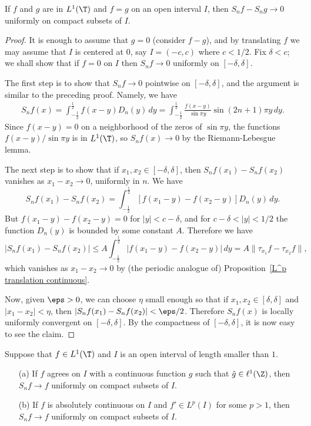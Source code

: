 \begin{theorem}
If $f$ and $g$ are in $L^1(\T)$ and $f=g$ on an open interval $I$, then $S_nf-S_ng\to 0$ uniformly on compact subsets of $I$.
\end{theorem}
\begin{proof}
It is enough to assume that $g=0$ (consider $f-g$), and by translating $f$ we may assume that $I$ is centered at $0$, say $I=(-c,c)$ where $c<1/2$. Fix $\delta<c$; we shall show that if $f=0$ on $I$ then $S_nf\to 0$ uniformly on $[-\delta,\delta]$.\par
The first step is to show that $S_nf\to 0$ pointwise on $[-\delta,\delta]$, and the argument is similar to the preceding proof. Namely, we have
\begin{align*}
S_nf(x)=\int_{-\frac{1}{2}}^{\frac{1}{2}}f(x-y)D_n(y)\,dy=\int_{-\frac{1}{2}}^{\frac{1}{2}}\frac{f(x-y)}{\sin\pi y}\sin(2n+1)\pi y\,dy.
\end{align*}
Since $f(x-y)=0$ on a neighborhood of the zeros of $\sin\pi y$, the functions $f(x-y)/\sin\pi y$ is in $L^1(\T)$, so $S_nf(x)\to 0$ by the Riemann-Lebesgue lemma.\par
The next step is to show that if $x_1,x_2\in [-\delta,\delta]$, then $S_nf(x_1)-S_nf(x_2)$ vanishes as $x_1-x_2\to 0$, uniformly in $n$. We have
\[S_nf(x_1)-S_nf(x_2)=\int_{-\frac{1}{2}}^{\frac{1}{2}}[f(x_1-y)-f(x_2-y)]D_n(y)\,dy.\]
But $f(x_1-y)-f(x_2-y)=0$ for $|y|<c-\delta$, and for $c-\delta<|y|<1/2$ the function $D_n(y)$ is bounded by some constant $A$. Therefore we have
\[|S_nf(x_1)-S_nf(x_2)|\leq A\int_{-\frac{1}{2}}^{\frac{1}{2}}|f(x_1-y)-f(x_2-y)|\,dy=A\|\tau_{x_1}f-\tau_{x_2}f\|,\]
which vanishes as $x_1-x_2\to 0$ by (the periodic analogue of) Proposition~\ref{L^p translation continuous}.\par
Now, given $\eps>0$, we can choose $\eta$ small enough so that if $x_1,x_2\in[\delta,\delta]$ and $|x_1-x_2|<\eta$, then $|S_nf(x_1)-S_nf(x_2)|<\eps/2$. Therefore $S_nf(x)$ is locally uniformly convergent on $[-\delta,\delta]$. By the compactness of $[-\delta,\delta]$, it is now easy to see the claim.
\end{proof}
\begin{corollary}\label{Fourier series converge uniformly if}
Suppose that $f\in L^1(\T)$ and $I$ is an open interval of length smaller than $1$.
\begin{itemize}
\item[(a)] If $f$ agrees on $I$ with a continuous function $g$ such that $\hat{g}\in\ell^1(\Z)$, then $S_nf\to f$ uniformly on compact subsets of $I$.
\item[(b)] If $f$ is absolutely continuous on $I$ and $f'\in L^p(I)$ for some $p>1$, then $S_nf\to f$ uniformly on compact subsets of $I$.
\end{itemize}
\end{corollary}
